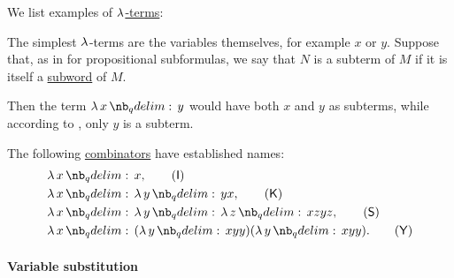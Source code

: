 \begin{example}\label{ex:def:lambda_term}
  We list examples of \hyperref[def:lambda_term]{\( \mathrm{\lambda} \)-terms}:
  \begin{thmenum}
     The simplest \( \mathrm{\lambda} \)-terms are the variables themselves, for example \( x \) or \( y \).
     Suppose that, as in  for propositional subformulas, we say that \( N \) is a subterm of \( M \) if it is itself a \hyperref[def:formal_language/subword]{subword} of \( M \).

    Then the term \( \qabs x y \) would have both \( x \) and \( y \) as subterms, while according to , only \( y \) is a subterm.

     The following \hyperref[def:lambda_term/closed]{combinators} have established names:
    \begin{align}
      &\qabs x x, \label{eq:ex:def:lambda_term/combinator/i}\tag{\logic{I}} \\
      &\qabs x \qabs y yx, \nonumber\label{eq:ex:def:lambda_term/combinator/k}\tag{\logic{K}} \\
      &\qabs x \qabs y \qabs z xzyz, \label{eq:ex:def:lambda_term/combinator/s}\tag{\logic{S}} \\
      &\qabs x (\qabs y xyy) (\qabs y xyy). \label{eq:ex:def:lambda_term/combinator/y}\tag{\logic{Y}}
    \end{align}
  \end{thmenum}
\end{example}

\paragraph{Variable substitution}

